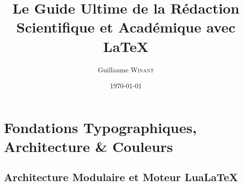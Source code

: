 \documentclass[
  english,             %
  french,              %
  font=calibri,        %
  todoNote             %
]{ClasseGuillaume}
\title{Le Guide Ultime de la Rédaction Scientifique et Académique avec \LaTeX{}}
\author{Guillaume \textsc{Winant}}
\date{\today}
\begin{document}
\frontmatter
\masquerLogo %

\begin{pageDesign}[left=1.4cm, right=1.4cm, top=1.6cm, bottom=1.6cm]
  
\end{pageDesign}

\geometrieWord






\setcounter{tocdepth}{2}
\tableofcontents

\mainmatter
\afficherLogo %

\part{Fondations Typographiques, Architecture \& Couleurs}
\label{part:fondations}

\chapter{Architecture Modulaire et Moteur Lua\LaTeX{}}
\label{chap:fondations}



\end{document}
